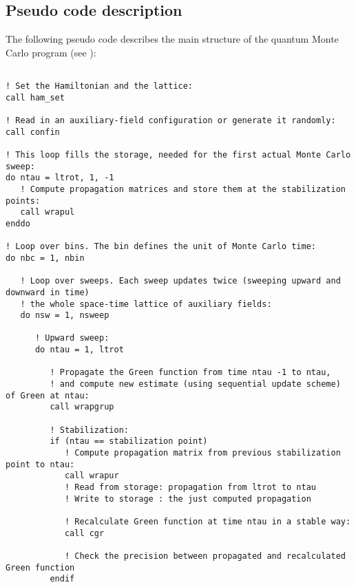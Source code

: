 %
\subsection{Pseudo code description}\label{sec:pseudocode}
%
The following pseudo code describes the main structure of the quantum Monte Carlo program (see ):
\lstset{style=fortran_pseudo_code}
\begin{lstlisting}

! Set the Hamiltonian and the lattice:
call ham_set

! Read in an auxiliary-field configuration or generate it randomly:
call confin

! This loop fills the storage, needed for the first actual Monte Carlo sweep:
do ntau = ltrot, 1, -1 
   ! Compute propagation matrices and store them at the stabilization points:
   call wrapul 
enddo

! Loop over bins. The bin defines the unit of Monte Carlo time:
do nbc = 1, nbin 

   ! Loop over sweeps. Each sweep updates twice (sweeping upward and downward in time)
   ! the whole space-time lattice of auxiliary fields:
   do nsw = 1, nsweep 
   
      ! Upward sweep:
      do ntau = 1, ltrot
      
         ! Propagate the Green function from time ntau -1 to ntau, 
         ! and compute new estimate (using sequential update scheme) of Green at ntau: 
         call wrapgrup
         
         ! Stabilization:      
         if (ntau == stabilization point)
            ! Compute propagation matrix from previous stabilization point to ntau: 
            call wrapur
            ! Read from storage: propagation from ltrot to ntau
            ! Write to storage : the just computed propagation 
                        
            ! Recalculate Green function at time ntau in a stable way:
            call cgr
            
            ! Check the precision between propagated and recalculated Green function
         endif
        

\end{lstlisting}
